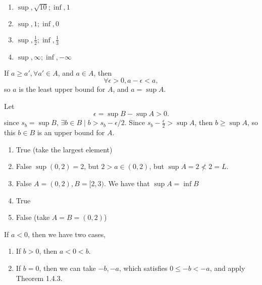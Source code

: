 \begin{exercise}
\begin{enumerate}[label=(\alph*)]
	\item $\sup, \sqrt{10}; \inf, 1$
	\item $\sup, 1; \inf, 0$
	\item $\sup, \frac{1}{2}; \inf, \frac{1}{3}$
	\item $\sup, \infty; \inf, -\infty$
\end{enumerate}
\end{exercise}

\begin{exercise}
	If $a \geq a', \forall a' \in A$, and $a \in A$, then
	\begin{equation}
		\forall \epsilon > 0, a - \epsilon < a,
	\end{equation}
	so $a$ is the least upper bound for $A$, and $a = \sup A$.
\end{exercise}

\begin{exercise}
	Let \begin{equation}
	\epsilon = \sup B - \sup A > 0.
	\end{equation}
	since $s_b = \sup B$, $\exists b \in B \mid b > s_b - \epsilon / 2$. Since $s_b - \frac{\epsilon}{2} > \sup A$, then $b \geq \sup A$, so this $b \in B$ is an upper bound for $A$.
\end{exercise}

\begin{exercise}
\begin{enumerate}[label=(\alph*)]
	\item True (take the largest element)
	\item False $\sup (0, 2) = 2$, but $2 > a \in (0, 2)$, but $\sup A = 2 \not < 2 = L$.
	\item False $A = (0, 2), B = [2, 3)$. We have that $\sup A = \inf B$
	\item True
	\item False (take $A = B = (0, 2)$)
\end{enumerate}
\end{exercise}

\setcounter{subsection}{4}
\setcounter{exercise}{0}

\begin{exercise}
	If $a<0$, then we have two cases,
	\begin{enumerate}
		\item If $b > 0$, then $a < 0 < b$.
		\item If $b = 0$, then we can take $-b, -a$, which satisfies $0 \leq -b < -a$, and apply Theorem 1.4.3.
	\end{enumerate}
\end{exercise}

